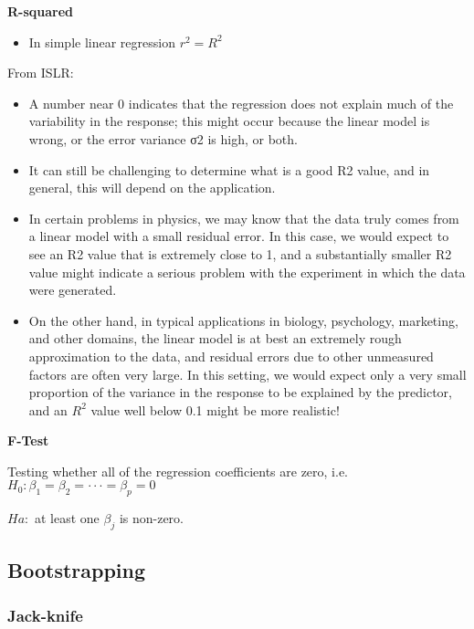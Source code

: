 \documentclass[
]{book}
\providecommand{\tightlist}{%
  \setlength{\itemsep}{0pt}\setlength{\parskip}{0pt}}
\begin{document}
\textbf{R-squared}

\begin{itemize}
\tightlist
\item
  In simple linear regression \(r^2 = R^2\)
\end{itemize}

From ISLR:

\begin{itemize}
\item
  A number near 0 indicates that the regression does not explain much of the variability in the response; this might occur because the linear model is wrong, or the error variance σ2 is high, or both.
\item
  It can still be challenging to determine what is a good R2 value, and in general, this will depend on the application.
\item
  In certain problems in physics, we may know that the data truly comes from a linear model with a small residual error. In this case, we would expect to see an R2 value that is extremely close to 1, and a substantially smaller R2 value might indicate a serious problem with the experiment in which the data were generated.
\item
  On the other hand, in typical applications in biology, psychology, marketing, and other domains, the linear model is at best an extremely rough approximation to the data, and residual errors due to other unmeasured factors are often very large. In this setting, we would expect only a very small proportion of the variance in the response to be explained by the predictor, and an \(R^2\) value well below 0.1 might be more realistic!
\end{itemize}

\textbf{F-Test}

Testing whether all of the regression coefficients are zero, i.e.~
\(H_0 :β_1 = β_2 =···=β_p = 0\)

\(Ha :\) at least one \(β_j\) is non-zero.

\hypertarget{bootstrapping}{%
\subsection{Bootstrapping}\label{bootstrapping}}

\hypertarget{jack-knife}{%
\subsubsection{Jack-knife}\label{jack-knife}}
\end{document}

